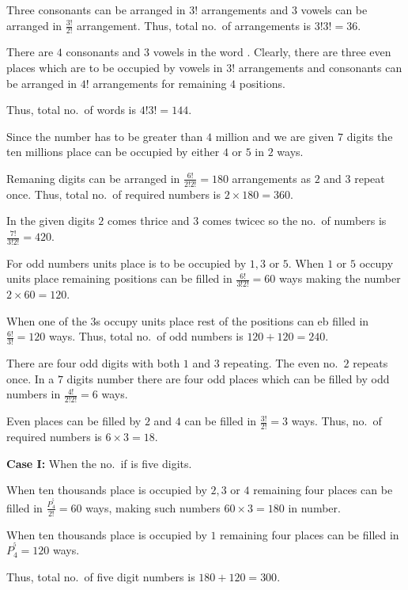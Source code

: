   Three consonants can be arranged in $3!$ arrangements and $3$ vowels can be arranged in $\frac{3!}{2!}$
  arrangement. Thus, total no.\ of arrangements is $3!3! = 36$.
\item There are $4$ consonants and $3$ vowels in the word . Clearly, there are three even
  places which are to be occupied by vowels in $3!$ arrangements and consonants can be arranged in $4!$
  arrangements for remaining $4$ positions.

  Thus, total no.\ of words is $4!3! = 144$.
\item Since the number has to be greater than $4$ million and we are given $7$ digits the ten millions place
  can be occupied by either $4$ or $5$ in $2$ ways.

  Remaning digits can be arranged in $\frac{6!}{2!2!} = 180$ arrangements as $2$ and $3$ repeat once. Thus,
  total no.\ of required numbers is $2\times180 = 360$.
\item In the given digits $2$ comes thrice and $3$ comes twicec so the no.\ of numbers is $\frac{7!}{3!2!} =
  420$.

  For odd numbers units place is to be occupied by $1, 3$ or $5$. When $1$ or $5$ occupy units place
  remaining positions can be filled in $\frac{6!}{3!2!} = 60$ ways making the number $2\times60 = 120$.

  When one of the $3$\symbol[rightquote]s occupy units place rest of the positions can eb filled in $\frac{6!}{3!} = 120$
  ways. Thus, total no.\ of odd numbers is $120 + 120 = 240$.
\item There are four odd digits with both $1$ and $3$ repeating. The even no.\ $2$ repeats once. In a $7$
  digits number there are four odd places which can be filled by odd numbers in $\frac{4!}{2!2!} = 6$ ways.

  Even places can be filled by $2$ and $4$ can be filled in $\frac{3!}{2!} = 3$ ways. Thus, no.\ of required
  numbers is $6\times3 = 18$.
\item {\bf Case I:} When the no.\ if is five digits.

  When ten thousands place is occupied by $2, 3$ or $4$ remaining four places can be filled in
  $\frac{P_4^^5}{2!} = 60$ ways, making such numbers $60\times3 = 180$ in number.

  When ten thousands place is occupied by $1$ remaining four places can be filled in $P_4^^5 = 120$ ways.

  Thus, total no.\ of five digit numbers is $180 + 120 = 300$.

